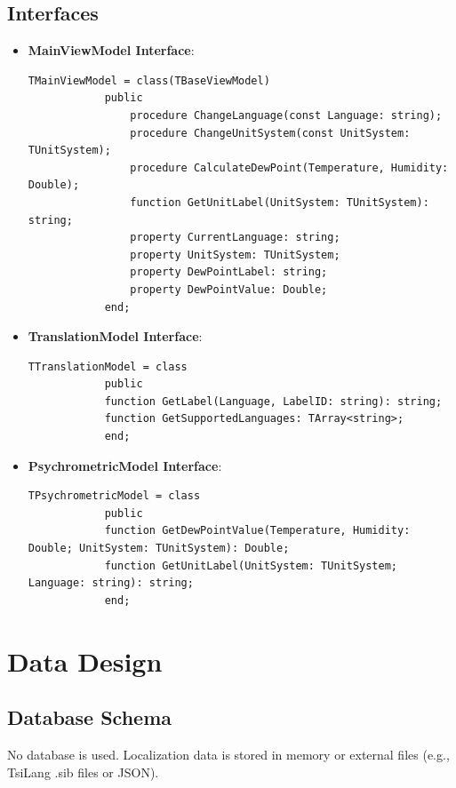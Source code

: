 \documentclass[12pt,a4paper]{article}
\begin{document}
	\subsection{Interfaces}
	\begin{itemize}
		\item \textbf{MainViewModel Interface}:
		
		\begin{lstlisting}[language=Delphi]
			TMainViewModel = class(TBaseViewModel)
			public
				procedure ChangeLanguage(const Language: string);
				procedure ChangeUnitSystem(const UnitSystem: TUnitSystem);
				procedure CalculateDewPoint(Temperature, Humidity: Double);
				function GetUnitLabel(UnitSystem: TUnitSystem): string;
				property CurrentLanguage: string;
				property UnitSystem: TUnitSystem;
				property DewPointLabel: string;
				property DewPointValue: Double;
			end;
		\end{lstlisting}

		\item \textbf{TranslationModel Interface}:
		\begin{lstlisting}[language=Delphi]
			TTranslationModel = class
			public
			function GetLabel(Language, LabelID: string): string;
			function GetSupportedLanguages: TArray<string>;
			end;
		\end{lstlisting}
		\item \textbf{PsychrometricModel Interface}:
		\begin{lstlisting}[language=Delphi]
			TPsychrometricModel = class
			public
			function GetDewPointValue(Temperature, Humidity: Double; UnitSystem: TUnitSystem): Double;
			function GetUnitLabel(UnitSystem: TUnitSystem; Language: string): string;
			end;
		\end{lstlisting}
	\end{itemize}
	
	\section{Data Design}
	\subsection{Database Schema}
	No database is used. Localization data is stored in memory or external files (e.g., TsiLang .sib files or JSON).
	
\end{document}
